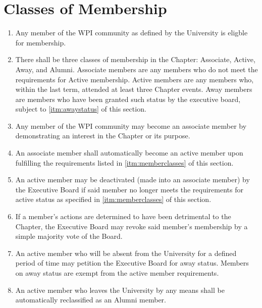 \documentclass[12pt, letterpaper, oneside]{book}
\begin{document}
\section{Classes of Membership} \label{sec:memberclasses}
\begin{enumerate}
    \item Any member of the WPI community as defined by the University is
        eligble for membership.
    \item \label{itm:memberclasses} There shall be three classes of membership in the Chapter: Associate,
        Active, Away, and Alumni.
        \subitem Associate members are any members who do not meet the
        requirements for Active membership.
        \subitem Active members are any members who, within the last
        term, attended at least three Chapter events.
        \subitem Away members are members who have been granted such status by
        the executive board, subject to \cref{itm:awaystatus} of this section.
    \item \label{itm:associate} Any member of the WPI community may become an
        associate member by demonstrating an interest in the Chapter or its
        purpose.
    \item \label{itm:activation} An associate member shall automatically become
        an active member upon fulfilling the requirements listed in
        \cref{itm:memberclasses} of this section.
    \item \label{itm:deactivation} An active member may be deactivated (made
        into an associate member) by the Executive Board if said member no
        longer meets the requirements for active status as specified in
        \cref{itm:memberclasses} of this section.
    \item \label{itm:expulsion} If a member's actions are determined to have
        been detrimental to the Chapter, the Executive Board may revoke said
        member's membership by a simple majority vote of the Board.
    \item \label{itm:awaystatus} An active member who will be absent from the
        University for a defined period of time may petition the Executive
        Board for away status. Members on away status are exempt from the
        active member requirements.
    \item \label{itm:memberalumni} An active member who leaves the University by
        any means shall be automatically reclassified as an Alumni member.
\end{enumerate}
\end{document}
